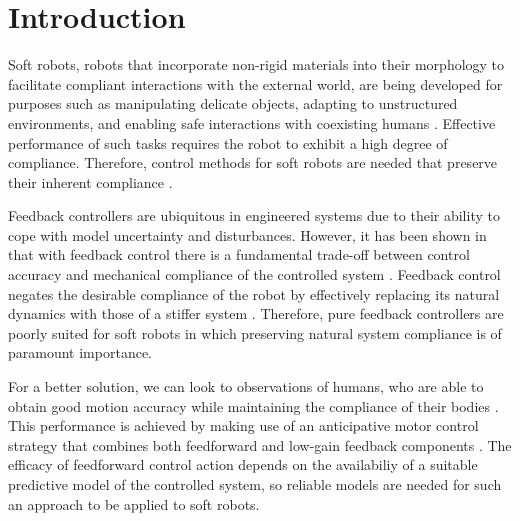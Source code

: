 \section{Introduction}
\label{sec:intro}

Soft robots, robots that incorporate non-rigid materials into their morphology to facilitate compliant interactions with the external world, are being developed for purposes such as manipulating delicate objects, adapting to unstructured environments, and enabling safe interactions with coexisting humans \cite{rus2015design}.  
Effective performance of such tasks requires the robot to exhibit a high degree of compliance.
Therefore, control methods for soft robots are needed that preserve their inherent compliance .

Feedback controllers are ubiquitous in engineered systems due to their ability to cope with model uncertainty and disturbances.
However, it has been shown in \cite{della2017controlling} that with feedback control there is a fundamental trade-off between control accuracy and mechanical compliance of the controlled system .
Feedback control negates the desirable compliance of the robot by effectively replacing its natural dynamics with those of a stiffer system .
Therefore, pure feedback controllers are poorly suited for soft robots in which preserving natural system compliance is of paramount importance.

For a better solution, we can look to observations of humans, who are able to obtain good motion accuracy while maintaining the compliance of their bodies \cite{wolpert2011principles}.
This performance is achieved by making use of an anticipative motor control strategy that combines both feedforward and low-gain feedback components \cite{kawato1999internal}.
The efficacy of feedforward control action depends on the availabiliy of a suitable predictive model of the controlled system, so reliable models are needed for such an approach to be applied to soft robots.

